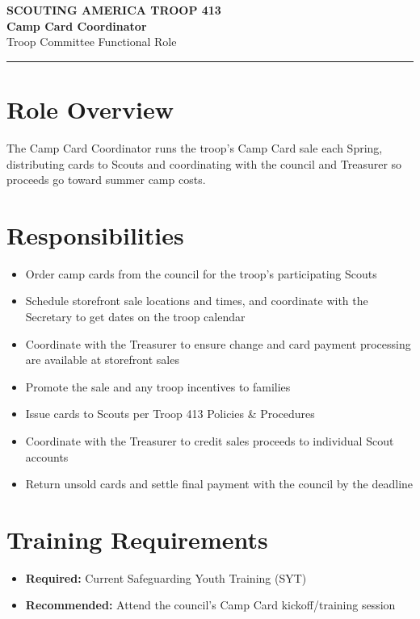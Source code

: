 \documentclass[11pt, letterpaper]{article}
\begin{document}
\begin{center}
  {\small\color{scoutgreen}\textbf{SCOUTING AMERICA \textbullet{} TROOP 413}} \\[4pt]
  {\fontsize{20pt}{24pt}\selectfont\bfseries\color{scoutgreen} Camp Card Coordinator} \\[4pt]
  {\large\color{accent} Troop Committee \textbullet{} Functional Role} \\[4pt]
  \textcolor{accent}{\rule{0.6\linewidth}{1pt}}
\end{center}

\vspace{0.3em}

\begin{minipage}[t]{0.48\linewidth}
\raggedright

\section{Role Overview}
The Camp Card Coordinator runs the troop's Camp Card sale each Spring, distributing cards to Scouts and coordinating with the council and Treasurer so proceeds go toward summer camp costs.

\vspace{0.4em}
\section{Responsibilities}
\begin{itemize}
  \item Order camp cards from the council for the troop's participating Scouts
  \item Schedule storefront sale locations and times, and coordinate with the Secretary to get dates on the troop calendar
  \item Coordinate with the Treasurer to ensure change and card payment processing are available at storefront sales
  \item Promote the sale and any troop incentives to families
  \item Issue cards to Scouts per Troop 413 Policies \& Procedures
  \item Coordinate with the Treasurer to credit sales proceeds to individual Scout accounts
  \item Return unsold cards and settle final payment with the council by the deadline
\end{itemize}

\section{Training Requirements}
\begin{itemize}
  \item \textbf{Required:} Current Safeguarding Youth Training (SYT)
  \item \textbf{Recommended:} Attend the council's Camp Card kickoff/training session
\end{itemize}

\end{minipage}
\end{document}
